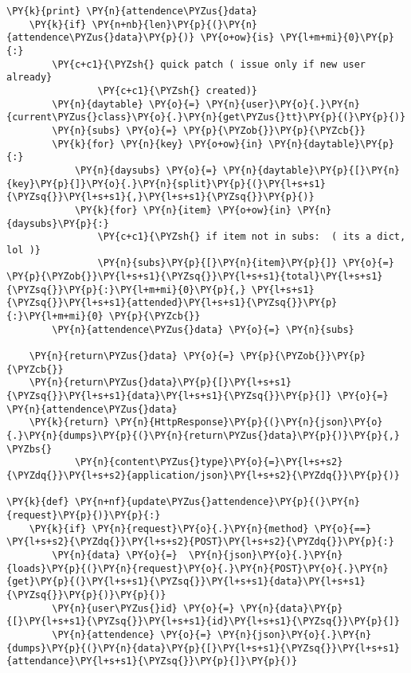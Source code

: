 \begin{Verbatim}[commandchars=\\\{\}]
    \PY{k}{print} \PY{n}{attendence\PYZus{}data}
    \PY{k}{if} \PY{n+nb}{len}\PY{p}{(}\PY{n}{attendence\PYZus{}data}\PY{p}{)} \PY{o+ow}{is} \PY{l+m+mi}{0}\PY{p}{:}
        \PY{c+c1}{\PYZsh{} quick patch ( issue only if new user already}
                \PY{c+c1}{\PYZsh{} created)}
        \PY{n}{daytable} \PY{o}{=} \PY{n}{user}\PY{o}{.}\PY{n}{current\PYZus{}class}\PY{o}{.}\PY{n}{get\PYZus{}tt}\PY{p}{(}\PY{p}{)}
        \PY{n}{subs} \PY{o}{=} \PY{p}{\PYZob{}}\PY{p}{\PYZcb{}}
        \PY{k}{for} \PY{n}{key} \PY{o+ow}{in} \PY{n}{daytable}\PY{p}{:}
            \PY{n}{daysubs} \PY{o}{=} \PY{n}{daytable}\PY{p}{[}\PY{n}{key}\PY{p}{]}\PY{o}{.}\PY{n}{split}\PY{p}{(}\PY{l+s+s1}{\PYZsq{}}\PY{l+s+s1}{,}\PY{l+s+s1}{\PYZsq{}}\PY{p}{)}
            \PY{k}{for} \PY{n}{item} \PY{o+ow}{in} \PY{n}{daysubs}\PY{p}{:}
                \PY{c+c1}{\PYZsh{} if item not in subs:  ( its a dict, lol )}
                \PY{n}{subs}\PY{p}{[}\PY{n}{item}\PY{p}{]} \PY{o}{=} \PY{p}{\PYZob{}}\PY{l+s+s1}{\PYZsq{}}\PY{l+s+s1}{total}\PY{l+s+s1}{\PYZsq{}}\PY{p}{:}\PY{l+m+mi}{0}\PY{p}{,} \PY{l+s+s1}{\PYZsq{}}\PY{l+s+s1}{attended}\PY{l+s+s1}{\PYZsq{}}\PY{p}{:}\PY{l+m+mi}{0} \PY{p}{\PYZcb{}}
        \PY{n}{attendence\PYZus{}data} \PY{o}{=} \PY{n}{subs}

    \PY{n}{return\PYZus{}data} \PY{o}{=} \PY{p}{\PYZob{}}\PY{p}{\PYZcb{}}
    \PY{n}{return\PYZus{}data}\PY{p}{[}\PY{l+s+s1}{\PYZsq{}}\PY{l+s+s1}{data}\PY{l+s+s1}{\PYZsq{}}\PY{p}{]} \PY{o}{=} \PY{n}{attendence\PYZus{}data}
    \PY{k}{return} \PY{n}{HttpResponse}\PY{p}{(}\PY{n}{json}\PY{o}{.}\PY{n}{dumps}\PY{p}{(}\PY{n}{return\PYZus{}data}\PY{p}{)}\PY{p}{,} \PYZbs{}
            \PY{n}{content\PYZus{}type}\PY{o}{=}\PY{l+s+s2}{\PYZdq{}}\PY{l+s+s2}{application/json}\PY{l+s+s2}{\PYZdq{}}\PY{p}{)}

\PY{k}{def} \PY{n+nf}{update\PYZus{}attendence}\PY{p}{(}\PY{n}{request}\PY{p}{)}\PY{p}{:}
    \PY{k}{if} \PY{n}{request}\PY{o}{.}\PY{n}{method} \PY{o}{==} \PY{l+s+s2}{\PYZdq{}}\PY{l+s+s2}{POST}\PY{l+s+s2}{\PYZdq{}}\PY{p}{:}
        \PY{n}{data} \PY{o}{=}  \PY{n}{json}\PY{o}{.}\PY{n}{loads}\PY{p}{(}\PY{n}{request}\PY{o}{.}\PY{n}{POST}\PY{o}{.}\PY{n}{get}\PY{p}{(}\PY{l+s+s1}{\PYZsq{}}\PY{l+s+s1}{data}\PY{l+s+s1}{\PYZsq{}}\PY{p}{)}\PY{p}{)}
        \PY{n}{user\PYZus{}id} \PY{o}{=} \PY{n}{data}\PY{p}{[}\PY{l+s+s1}{\PYZsq{}}\PY{l+s+s1}{id}\PY{l+s+s1}{\PYZsq{}}\PY{p}{]}
        \PY{n}{attendence} \PY{o}{=} \PY{n}{json}\PY{o}{.}\PY{n}{dumps}\PY{p}{(}\PY{n}{data}\PY{p}{[}\PY{l+s+s1}{\PYZsq{}}\PY{l+s+s1}{attendance}\PY{l+s+s1}{\PYZsq{}}\PY{p}{]}\PY{p}{)}


\end{Verbatim}
